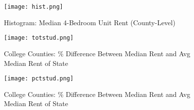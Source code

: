 \documentclass[12pt,english]{article}
\begin{document}

\begin{figure}[ht]
\caption{Histogram: Median 4-Bedroom Unit Rent (County-Level)}
\label{fig:fig1}
\centering
\bigskip{}
\texttt{[image: hist.png]}
\end{figure}
\clearpage



\begin{figure}[p]
\caption{College Counties: \% Difference Between Median Rent and Avg Median Rent of State}
\label{fig:fig2}
\centering
\bigskip{}
\texttt{[image: totstud.png]}
\end{figure}
\clearpage


\begin{figure}[p]
\caption{College Counties: \% Difference Between Median Rent and Avg Median Rent of State}
\label{fig:fig3}
\centering
\bigskip{}
\texttt{[image: pctstud.png]}
\end{figure}
\clearpage

\end{document}
